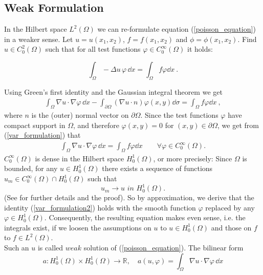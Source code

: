 \documentclass[a4paper, 11pt, twoside]{article}
\begin{document}
\subsection{Weak Formulation}\label{sectionWeak_formulation}
In the Hilbert space $L^2(\Omega)$ we can re-formulate equation (\ref{poisson_equation}) in a weaker sense. 
Let $u = u(x_1, x_2)$, $f = f(x_1, x_2)$ and $\phi = \phi (x_1, x_2)$.  Find $u \in C_0^2(\Omega)$ such that for all test functions $\varphi\in C_0^\infty(\Omega)$ it holds:

$$\int_\Omega - \Delta u\, \varphi\, \dd x = \int_\Omega f \varphi \dd x\ .$$

Using Green's first identity and the Gaussian integral theorem we get
\begin{eqnarray}\label{var_formulation}
\int_\Omega \nabla u\cdot \nabla\varphi\, \dd x - \int_{\partial\Omega} (\nabla u \cdot n) \varphi(x,y) \dd \sigma = \int_\Omega f \varphi \dd x\ ,
\end{eqnarray}
where $n$ is the (outer) normal vector on $\partial \Omega$. Since the test functions $\varphi$ have compact support in $\Omega$, and therefore $\varphi(x,y)=0$ for $(x,y)\in\partial \Omega$, we get from (\ref{var_formulation}) that
\begin{eqnarray}\label{var_formulation2}
\int_\Omega \nabla u \cdot \nabla\varphi\, \dd x = \int_\Omega f \varphi \dd x \qquad \forall \varphi\in C_0^\infty(\Omega).
\end{eqnarray}
$C_0^\infty(\Omega)$ is dense in the Hilbert space $H^1_0(\Omega)$, or more precisely: Since $\Omega$ is bounded, for any $u \in H^1_0(\Omega)$ there exists a sequence of functions $u_m \in C_0^\infty(\Omega) \cap H^1_0(\Omega)$ such that 
\begin{equation}
u_m \rightarrow u \textit{ in } H^1_0(\Omega).
\end{equation}
(See \cite[Section 5.3.2 Theorem 2]{evans} for further details and the proof). So by approximation, we derive that the identity (\ref{var_formulation2}) holds with the smooth function $\varphi$ replaced by any $\varphi \in H^1_0(\Omega)$. Consequently, the resulting equation makes even sense, i.e. the integrals exist, if we loosen the assumptions on $u$ to $u \in H^1_0(\Omega)$ and those on $f$ to $f \in L^2(\Omega)$. \\
Such an $u$ is called $\mathit{weak}$ solution  of (\ref{poisson_equation}).
The bilinear form 
\[
a: H^1_0(\Omega) \times H^1_0(\Omega) \rightarrow \mathbb{R},\quad a(u,\varphi)=\int_\Omega \nabla u \cdot \nabla\varphi\, \dd x  
\]
\end{document}
